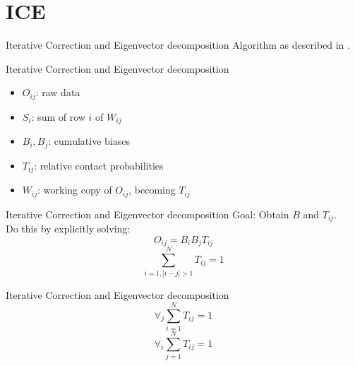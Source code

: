 \section{ICE}

\begin{frame}[c]{Iterative Correction and Eigenvector decomposition}
    \Large
    Algorithm as described in \cite{imakaev2012iterative}.
\end{frame}


\begin{frame}[c]{Iterative Correction and Eigenvector decomposition}
    \Large
    \begin{itemize}%
        \item<2-> $O_{ij}$: raw data
        \item<6-> $S_i$: sum of row $i$ of $W_{ij}$
        \item<5-> $B_i, B_j$: cumulative biases
        \item<3-> $T_{ij}$: relative contact probabilities
        \item<4-> $W_{ij}$: working copy of $O_{ij}$, becoming $T_{ij}$
    \end{itemize}
\end{frame}

\begin{frame}[c]{Iterative Correction and Eigenvector decomposition}
    \Large
    Goal: Obtain $B$ and $T_{ij}$. \\ \pause Do this by explicitly solving:
    \begin{equation} \label{eq:1}
    O_{ij} = B_i B_j T_{ij}
    \end{equation}
    \begin{equation} \label{eq:2}
    \sum^N_{i=1, |i-j|>1} T_{ij} = 1
    \end{equation}
\end{frame}


\begin{frame}[c]{Iterative Correction and Eigenvector decomposition}
    \begin{equation}
    \forall_j\sum^N_{i=1}T_{ij} = 1
    \end{equation}
    \begin{equation}
        \forall_i\sum^N_{j=1}T_{ij} = 1
    \end{equation}
\end{frame}

